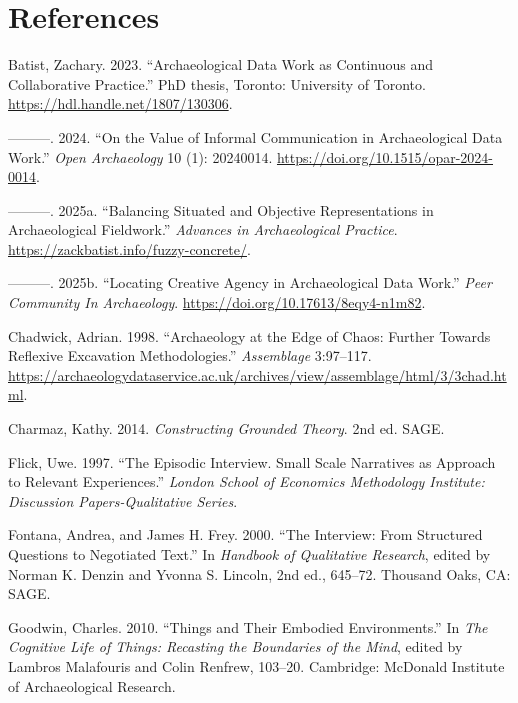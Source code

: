 \documentclass[
  canadian,
]{article}
\newlength{\cslhangindent}
\newenvironment{CSLReferences}[2] %
 {\begin{list}{}{%
  \setlength{\itemindent}{0pt}
  \setlength{\leftmargin}{0pt}
  \setlength{\parsep}{0pt}
  \ifodd #1
   \setlength{\leftmargin}{\cslhangindent}
   \setlength{\itemindent}{-1\cslhangindent}
  \fi
  \setlength{\itemsep}{#2\baselineskip}}}
 {\end{list}}
\begin{document}
\section{References}\label{references}

\label{refs}
\begin{CSLReferences}{1}{0}
Batist, Zachary. 2023. {``Archaeological Data Work as Continuous and
Collaborative Practice.''} PhD thesis, Toronto: University of Toronto.
\url{https://hdl.handle.net/1807/130306}.

---------. 2024. {``On the {Value} of {Informal Communication} in
{Archaeological Data Work}.''} \emph{Open Archaeology} 10 (1): 20240014.
\url{https://doi.org/10.1515/opar-2024-0014}.

---------. 2025a. {``Balancing {Situated} and {Objective
Representations} in {Archaeological Fieldwork}.''} \emph{Advances in
Archaeological Practice}. \url{https://zackbatist.info/fuzzy-concrete/}.

---------. 2025b. {``Locating {Creative Agency} in {Archaeological Data
Work}.''} \emph{Peer Community In Archaeology}.
\url{https://doi.org/10.17613/8eqy4-n1m82}.

Chadwick, Adrian. 1998. {``Archaeology at the Edge of Chaos: Further
Towards Reflexive Excavation Methodologies.''} \emph{Assemblage}
3:97--117.
\url{https://archaeologydataservice.ac.uk/archives/view/assemblage/html/3/3chad.html}.

Charmaz, Kathy. 2014. \emph{Constructing {Grounded Theory}}. 2nd ed.
SAGE.

Flick, Uwe. 1997. {``The Episodic Interview. {Small} Scale Narratives as
Approach to Relevant Experiences.''} \emph{London School of Economics
Methodology Institute: Discussion Papers-Qualitative Series}.

Fontana, Andrea, and James H. Frey. 2000. {``The {Interview}: {From
Structured Questions} to {Negotiated Text}.''} In \emph{Handbook of
{Qualitative Research}}, edited by Norman K. Denzin and Yvonna S.
Lincoln, 2nd ed., 645--72. Thousand Oaks, CA: SAGE.

Goodwin, Charles. 2010. {``Things and Their Embodied Environments.''} In
\emph{The Cognitive Life of Things: {Recasting} the Boundaries of the
Mind}, edited by Lambros Malafouris and Colin Renfrew, 103--20.
Cambridge: McDonald Institute of Archaeological Research.


\end{CSLReferences}
\end{document}
